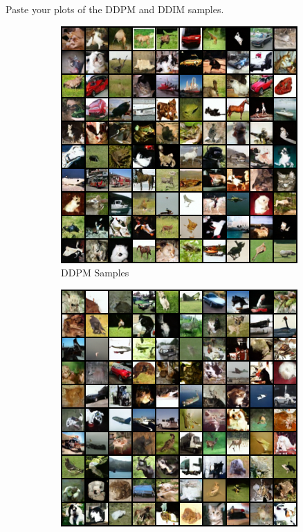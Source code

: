 \documentclass[11pt,addpoints,answers]{exam}
\numberwithin{equation}{section} %
\numberwithin{figure}{section} %
\numberwithin{table}{section} %
\begin{document}
\begin{questions}
\question Paste your plots of the DDPM and DDIM samples.
\begin{figure}[H]
    \centering
    \begin{subfigure}[b]{0.32\linewidth}
        \includegraphics[width=\linewidth]{samples_ddpm.png}
        \caption{DDPM Samples}
    \end{subfigure}
    \begin{subfigure}[b]{0.32\linewidth}
        \includegraphics[width=\linewidth]{samples_ddim.png}

\end{subfigure}
\end{figure}
\end{questions}
\end{document}
